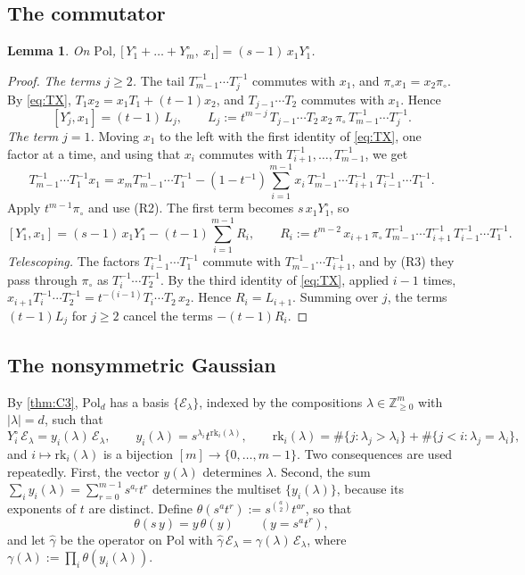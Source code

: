 \documentclass[11pt]{amsart}
\newtheorem{lemma}[theorem]{Lemma}
\theoremstyle{definition}
\theoremstyle{remark}
\numberwithin{equation}{section}
\begin{document}
\subsection{The commutator}
\begin{lemma}\label{lem:I}
On $\mathrm{Pol}$, $\bigl[\,Y^\circ_1+\dots+Y^\circ_m,\ x_1\bigr]=(s-1)\,x_1Y^\circ_1$.
\end{lemma}
\begin{proof}
\emph{The terms $j\ge2$.} The tail $T_{m-1}^{-1}\cdots T_j^{-1}$ commutes with $x_1$, and $\pi_\circ x_1=x_2\pi_\circ$. By \eqref{eq:TX}, $T_1x_2=x_1T_1+(t-1)x_2$, and $T_{j-1}\cdots T_2$ commutes with $x_1$. Hence
\[ [Y^\circ_j,x_1]=(t-1)\,L_j,\qquad L_j:=t^{m-j}\,T_{j-1}\cdots T_2\,x_2\,\pi_\circ\,T_{m-1}^{-1}\cdots T_j^{-1}. \]
\emph{The term $j=1$.} Moving $x_1$ to the left with the first identity of \eqref{eq:TX}, one factor at a time, and using that $x_i$ commutes with $T_{i+1}^{-1},\dots,T_{m-1}^{-1}$, we get
\[ T_{m-1}^{-1}\cdots T_1^{-1}x_1=x_mT_{m-1}^{-1}\cdots T_1^{-1}-(1-t^{-1})\sum_{i=1}^{m-1}x_i\,T_{m-1}^{-1}\cdots T_{i+1}^{-1}\,T_{i-1}^{-1}\cdots T_1^{-1}. \]
Apply $t^{m-1}\pi_\circ$ and use (R2). The first term becomes $s\,x_1Y^\circ_1$, so
\[ [Y^\circ_1,x_1]=(s-1)\,x_1Y^\circ_1-(t-1)\sum_{i=1}^{m-1}R_i,\qquad R_i:=t^{m-2}\,x_{i+1}\,\pi_\circ\,T_{m-1}^{-1}\cdots T_{i+1}^{-1}\,T_{i-1}^{-1}\cdots T_1^{-1}. \]
\emph{Telescoping.} The factors $T_{i-1}^{-1}\cdots T_1^{-1}$ commute with $T_{m-1}^{-1}\cdots T_{i+1}^{-1}$, and by (R3) they pass through $\pi_\circ$ as $T_i^{-1}\cdots T_2^{-1}$. By the third identity of \eqref{eq:TX}, applied $i-1$ times, $x_{i+1}T_i^{-1}\cdots T_2^{-1}=t^{-(i-1)}T_i\cdots T_2\,x_2$. Hence $R_i=L_{i+1}$. Summing over $j$, the terms $(t-1)L_j$ for $j\ge2$ cancel the terms $-(t-1)R_i$.
\end{proof}

\subsection{The nonsymmetric Gaussian}
By \cref{thm:C3}, $\mathrm{Pol}_d$ has a basis $\{\mathcal E_\lambda\}$, indexed by the compositions $\lambda\in\mathbb{Z}_{\ge0}^m$ with $|\lambda|=d$, such that
\[ Y^\circ_i\,\mathcal E_\lambda=y_i(\lambda)\,\mathcal E_\lambda,\qquad y_i(\lambda)=s^{\lambda_i}t^{\mathrm{rk}_i(\lambda)},\qquad \mathrm{rk}_i(\lambda)=\#\{j:\lambda_j>\lambda_i\}+\#\{j<i:\lambda_j=\lambda_i\}, \]
and $i\mapsto\mathrm{rk}_i(\lambda)$ is a bijection $[m]\to\{0,\dots,m-1\}$. Two consequences are used repeatedly. First, the vector $y(\lambda)$ determines $\lambda$. Second, the sum $\sum_iy_i(\lambda)=\sum_{r=0}^{m-1}s^{a_r}t^r$ determines the multiset $\{y_i(\lambda)\}$, because its exponents of $t$ are distinct. Define $\theta(s^at^r):=s^{\binom a2}t^{ar}$, so that
\begin{equation}\label{eq:theta}
\theta(s\,y)=y\,\theta(y)\qquad(y=s^at^r),
\end{equation}
and let $\widehat\gamma$ be the operator on $\mathrm{Pol}$ with $\widehat\gamma\,\mathcal E_\lambda=\gamma(\lambda)\,\mathcal E_\lambda$, where $\gamma(\lambda):=\prod_i\theta(y_i(\lambda))$.
\end{document}
